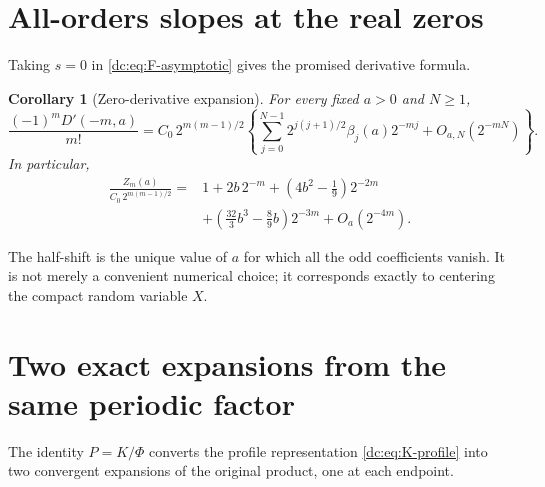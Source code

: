 \documentclass[11pt,a4paper,oneside,openany]{book}
\numberwithin{equation}{chapter}
\newtheorem{corollary}[theorem]{Corollary}
\theoremstyle{definition}
\theoremstyle{remark}
\begin{document}
\section{All-orders slopes at the real zeros}
Taking $s=0$ in \cref{dc:eq:F-asymptotic} gives the promised derivative
formula.
\begin{corollary}[Zero-derivative expansion]
\label{dc:cor:Z-expansion}
For every fixed $a>0$ and $N\ge1$,
\begin{equation}
 \boxed{\displaystyle
 \frac{(-1)^mD'(-m,a)}{m!}
 =C_0\,2^{m(m-1)/2}
 \left\{\sum_{j=0}^{N-1}
 2^{j(j+1)/2}\beta_j(a)2^{-mj}+O_{a,N}(2^{-mN})\right\}.}
 \label{dc:eq:Z-expansion}
\end{equation}
In particular,
\begin{align}
 \frac{Z_m(a)}{C_0\,2^{m(m-1)/2}}
 ={}&1+2b\,2^{-m}
   +\left(4b^2-\frac19\right)2^{-2m}\nonumber\\
 &+\left(\frac{32}3b^3-\frac89b\right)2^{-3m}
   +O_a(2^{-4m}).
 \label{dc:eq:Z-first}
\end{align}
\end{corollary}
The half-shift is the unique value of $a$ for which all the odd
coefficients vanish. It is not merely a convenient numerical choice;
it corresponds exactly to centering the compact random variable $X$.


\section{Two exact expansions from the same periodic factor}
The identity $P=K/\Phi$ converts the profile representation
\eqref{dc:eq:K-profile} into two convergent expansions of the original
product, one at each endpoint.
\end{document}
